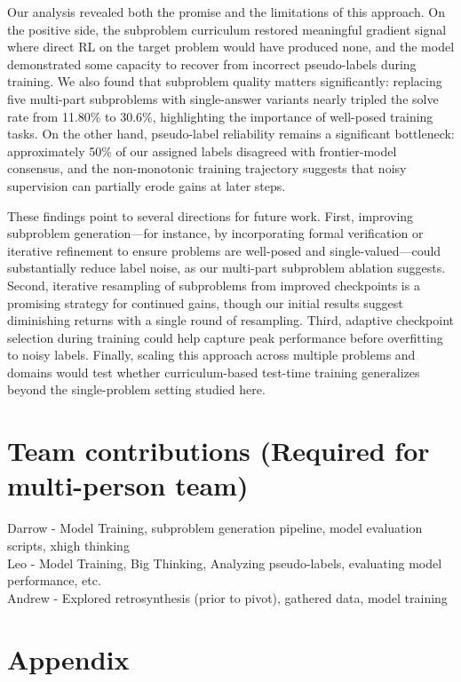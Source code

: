 \documentclass{article}
\begin{document}
Our analysis revealed both the promise and the limitations of this approach. On the positive side, the subproblem curriculum restored meaningful gradient signal where direct RL on the target problem would have produced none, and the model demonstrated some capacity to recover from incorrect pseudo-labels during training. We also found that subproblem quality matters significantly: replacing five multi-part subproblems with single-answer variants nearly tripled the solve rate from 11.80\% to 30.6\%, highlighting the importance of well-posed training tasks. On the other hand, pseudo-label reliability remains a significant bottleneck: approximately 50\% of our assigned labels disagreed with frontier-model consensus, and the non-monotonic training trajectory suggests that noisy supervision can partially erode gains at later steps.
 
These findings point to several directions for future work. First, improving subproblem generation---for instance, by incorporating formal verification or iterative refinement to ensure problems are well-posed and single-valued---could substantially reduce label noise, as our multi-part subproblem ablation suggests. Second, iterative resampling of subproblems from improved checkpoints is a promising strategy for continued gains, though our initial results suggest diminishing returns with a single round of resampling. Third, adaptive checkpoint selection during training could help capture peak performance before overfitting to noisy labels. Finally, scaling this approach across multiple problems and domains would test whether curriculum-based test-time training generalizes beyond the single-problem setting studied here.

\section*{Team contributions (Required for multi-person team)}

Darrow -  Model Training, subproblem generation pipeline, model evaluation scripts, xhigh thinking
\\Leo - Model Training, Big Thinking, Analyzing pseudo-labels, evaluating model performance, etc. 
\\ Andrew - Explored retrosynthesis (prior to pivot), gathered data, model training





\section{Appendix}
\label{sec:Appendix}
\end{document}
